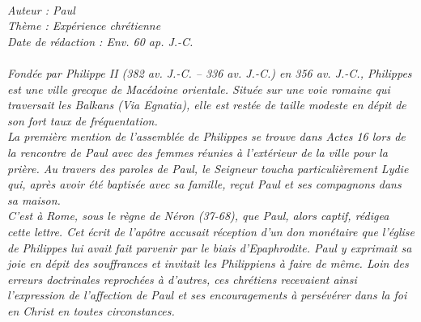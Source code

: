 \BFont
\noindent\hrulefill
{\footnotesize
\textit{
\bigskip
{\centering{}
\\Auteur : Paul
\\Thème : Expérience chrétienne
\\Date de rédaction : Env. 60 ap. J.-C.\\}
}
\textit{
\\Fondée par Philippe II (382 av. J.-C. – 336 av. J.-C.) en 356 av. J.-C., Philippes est une ville grecque de Macédoine orientale. Située sur une voie romaine qui traversait les Balkans (Via Egnatia), elle est restée de taille modeste en dépit de son fort taux de fréquentation.
\\La première mention de l'assemblée de Philippes se trouve dans Actes 16 lors de la rencontre de Paul avec des femmes réunies à l'extérieur de la ville pour la prière. Au travers des paroles de Paul, le Seigneur toucha particulièrement Lydie qui, après avoir été baptisée avec sa famille, reçut Paul et ses compagnons dans sa maison.
\\C'est à Rome, sous le règne de Néron (37-68), que Paul, alors captif, rédigea cette lettre. Cet écrit de l'apôtre accusait réception d'un don monétaire que l'église de Philippes lui avait fait parvenir par le biais d'Epaphrodite. Paul y exprimait sa joie en dépit des souffrances et invitait les Philippiens à faire de même. Loin des erreurs doctrinales reprochées à d'autres, ces chrétiens recevaient ainsi l'expression de l'affection de Paul et ses encouragements à persévérer dans la foi en Christ en toutes circonstances.\bigskip
}
}
\par\nobreak\noindent\hrulefill
